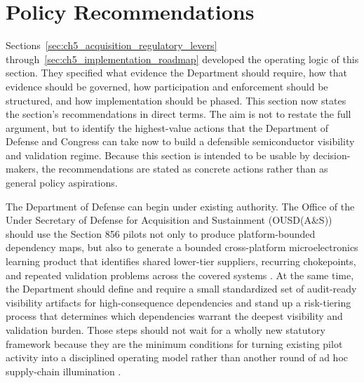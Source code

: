\section{Policy Recommendations}
\label{sec:ch5_recommendations_dod_congress}

Sections~\ref{sec:ch5_acquisition_regulatory_levers} through~\ref{sec:ch5_implementation_roadmap} developed the operating logic of this section. They specified what evidence the Department should require, how that evidence should be governed, how participation and enforcement should be structured, and how implementation should be phased. This section now states the section's recommendations in direct terms. The aim is not to restate the full argument, but to identify the highest-value actions that the Department of Defense and Congress can take now to build a defensible semiconductor visibility and validation regime. Because this section is intended to be usable by decision-makers, the recommendations are stated as concrete actions rather than as general policy aspirations.

The Department of Defense can begin under existing authority. The Office of the Under Secretary of Defense for Acquisition and Sustainment (OUSD(A\&S)) should use the Section 856 pilots not only to produce platform-bounded dependency maps, but also to generate a bounded cross-platform microelectronics learning product that identifies shared lower-tier suppliers, recurring chokepoints, and repeated validation problems across the covered systems \parencite{ch5_ndaa2024_sec856,U.S.GovernmentAccountabilityOffice2025}. At the same time, the Department should define and require a small standardized set of audit-ready visibility artifacts for high-consequence dependencies and stand up a risk-tiering process that determines which dependencies warrant the deepest visibility and validation burden. Those steps should not wait for a wholly new statutory framework because they are the minimum conditions for turning existing pilot activity into a disciplined operating model rather than another round of ad hoc supply-chain illumination \parencite{ch5_dod2022_supplychains,ch5_nist800161r1upd1}.

